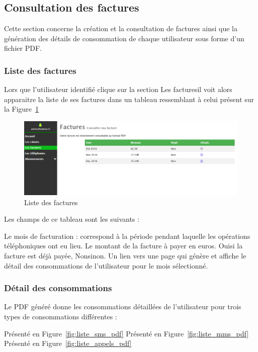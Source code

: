 \subsection{Consultation des factures}
Cette section concerne la création et la consultation de factures ainsi que la génération des détails de consommation de chaque utilisateur sous forme d'un fichier PDF.
\subsubsection{Liste des factures}
Lors que l'utilisateur identifié clique sur la section \og Les factures\fg il voit alors apparaitre la liste de ses factures dans un tableau ressemblant à celui présent sur la Figure~\ref{fig:listfacture}

\begin{figure}[ht]
  \centering
    \includegraphics[width=.55\textwidth]{images/Plateforme/liste_factures}
    \caption{Liste des factures}
    \label{fig:listfacture}
\end{figure}

Les champs de ce tableau sont les suivants :
\begin{itemize}
  Le mois de facturation : correspond à la période pendant laquelle les opérations téléphoniques ont eu lieu.
  Le montant de la facture à payer en euros.
  \og Oui\fg si la facture est déjà payée, \og Non\fg sinon.
  Un lien vers une page qui génère et affiche le détail des consommations de l'utilisateur pour le mois sélectionné.
\end{itemize}

\subsubsection{Détail des consommations}

Le PDF généré donne les consommations détaillées de l'utilisateur pour trois types de consommations différentes :
\begin{itemize}
	Présenté en Figure~\ref{fig:liste_sms_pdf}
	Présenté en Figure~\ref{fig:liste_mms_pdf}
	Présenté en Figure~\ref{fig:liste_appels_pdf}
\end{itemize}

